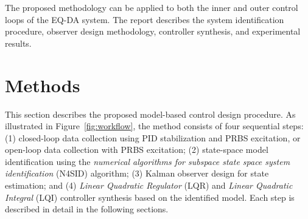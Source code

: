 \documentclass[12pt,a4paper]{article}
\begin{document}
The proposed methodology can be applied to both the inner and outer control loops of the EQ-DA system. The report describes the system identification procedure, observer design methodology, controller synthesis, and experimental results.

\tableofcontents
\newpage

\section{Methods}
This section describes the proposed model-based control design procedure. As illustrated in Figure~\ref{fig:workflow}, the method consists of four sequential steps: (1) closed-loop data collection using PID stabilization and PRBS excitation, or open-loop data collection with PRBS excitation; (2) state-space model identification using the \textit{numerical algorithms for subspace state space system identification} (N4SID) algorithm; (3) Kalman observer design for state estimation; and (4) \textit{Linear Quadratic Regulator} (LQR) and \textit{Linear Quadratic Integral} (LQI) controller synthesis based on the identified model. Each step is described in detail in the following sections.
\end{document}
